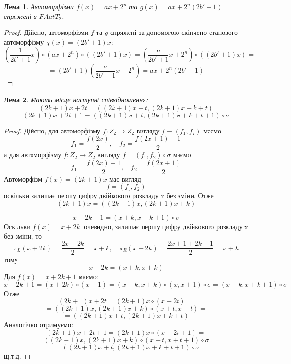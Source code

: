 \documentclass[a4paper,12pt]{article} \usepackage{a4wide}
\numberwithin{equation}{subsection}
\newtheorem{theorem}{Теорема}[subsection]
\newtheorem{lemma}{Лема}[subsection]
\begin{document}
\begin{lemma}\label{power_2_conj}
  Автоморфізми $f(x)=ax+2^n$ та $g(x)=ax+2^n(2b'+1)$ спряжені в
  $FAutT_2$.
\end{lemma}
\begin{proof}
  Дійсно, автоморфізми $f$ та $g$ спряжені за допомогою
  скінчено-станового автоморфізму $\chi (x) = (2b'+1)x$:
$$\left(\frac{1}{2b'+1}x\right)\circ (ax+2^n)\circ ((2b'+1)x)= \left(\frac{a}{2b'+1}x+2^n\right)\circ ((2b'+1)x)= $$
$$= (2b'+1)\left(\frac{a}{2b'+1}x+2^n\right) = ax + 2^n(2b'+1)$$
\end{proof}

\begin{lemma}\label{lin_states}
  Мають місце наступні співвідношення:
$$(2k+1)x+2t = ((2k+1)x+t,(2k+1)x+k+t)$$
$$(2k+1)x+2t+1 = ((2k+1)x+t,(2k+1)x+k+t+1)\circ \sigma$$
\end{lemma}
\begin{proof}
  Дійсно, для автоморфізму $f:Z_2\rightarrow Z_2$ вигляду $f = (f_1,
  f_2)$ маємо
$$f_1 = \frac{f(2x)}{2},\quad f_2 = \frac{f(2x+1)-1}{2}$$
а для автоморфізму $f:Z_2\rightarrow Z_2$ вигляду $f = (f_1,
f_2)\circ\sigma$ маємо
$$f_1 = \frac{f(2x)-1}{2},\quad f_2 = \frac{f(2x+1)}{2}$$
Автоморфізм $ f(x) = (2k+1)x $ має вигляд $$ f = (f_1, f_2) $$
оскільки залишає першу цифру двійкового розкладу x без зміни.
Отже $$(2k+1)x = ((2k+1)x,(2k+1)x+k)$$

$$x+2k+1 = (x+k, x+k+1)\circ\sigma$$
Оскільки $f(x)=x+2k$, очевидно, залишає першу цифру двійкового
розкладу x без зміни, то
$$\pi_L(x+2k) =  \frac{2x+2k}{2} = x+k, \quad \pi_R(x+2k) =  \frac{2x+1+2k-1}{2} = x+k $$
тому
$$x+2k = (x+k,x+k)$$
Для $f(x)=x+2k+1$ маємо:
$$x+2k+1 = (x+2k)\circ (x+1) = (x+k,x+k)\circ (x,x+1)\circ\sigma = (x+k, x+k+1)\circ\sigma $$
Отже
$$(2k+1)x+2t = (2k+1)x\circ(x+2t) =$$ $$=  ((2k+1)x,(2k+1)x+k)\circ  (x+t,x+t)=$$ $$ = ((2k+1)x+t,(2k+1)x+k+t) $$
Аналогічно отримуємо:
$$(2k+1)x+2t+1 = (2k+1)x\circ(x+2t+1) = $$ $$= ((2k+1)x,(2k+1)x+k)\circ  (x+t, x+t+1)\circ\sigma = $$ $$= ((2k+1)x+t,(2k+1)x+k+t+1)\circ\sigma $$
щ.т.д.
\end{proof}
\end{document}
